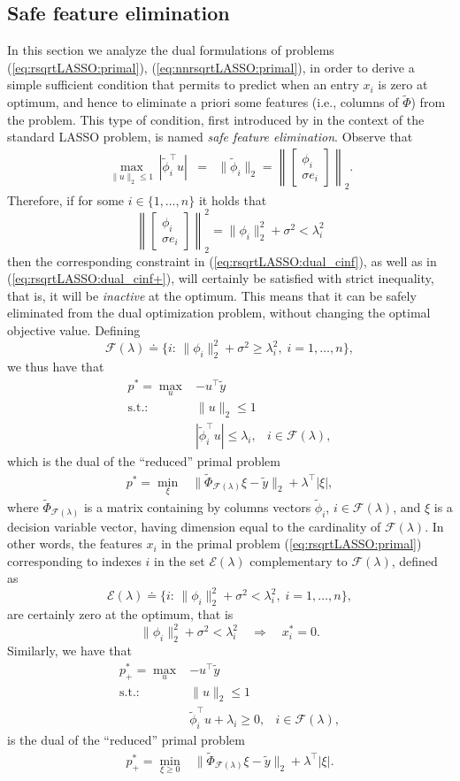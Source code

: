 \documentclass[11pt]{article}
\newcommand{\tran}{^{\top}}
\newcommand{\lam}{\lambda}
\newcommand{\beq}{\begin{equation}}
\newcommand{\eeq}{\end{equation}}
\newcommand{\bea}{\begin{eqnarray}}
\newcommand{\eea}{\end{eqnarray}}
\newcommand{\beas}{\begin{eqnarray*}}
\newcommand{\eeas}{\end{eqnarray*}}
\newcommand{\ba}{\begin{array}}
\newcommand{\ea}{\end{array}}
\newcommand{\calE}{{\mathcal E}}
\newcommand{\calF}{{\mathcal F}}
\begin{document}
\subsection{Safe feature elimination}
\label{sec:safelim}
In this section we analyze the dual formulations of problems (\ref{eq:rsqrtLASSO:primal}), (\ref{eq:nnrsqrtLASSO:primal}), in order to derive
a simple sufficient condition that permits to predict when an entry
$x_i$ is zero  at optimum, and hence to
eliminate a priori some features (i.e., columns of $\tilde \Phi$) from the problem.
This type of condition, first introduced by \cite{ElgViRa:12} in the context of the standard LASSO problem, is named {\em safe feature elimination}.
Observe that
\beas
\max_{ \|u\|_2\leq 1}\, |\tilde \phi_i\tran u | &=& \|\tilde\phi_i\|_2 = 
\left\|\left[\ba{c}\phi_i \\ \sigma e_i \ea\right]\right\|_2.
\eeas
Therefore, if for some $i\in\{1,\ldots,n\}$ it holds that
\[
\left\|\left[\ba{c}\phi_i \\ \sigma e_i \ea\right]\right\|_2^2 = 
\|\phi_i\|_2^2 + \sigma^2 < \lam_i^2
\]
then the corresponding constraint
in (\ref{eq:rsqrtLASSO:dual_cinf}), 
as well as in (\ref{eq:rsqrtLASSO:dual_cinf+}),
will certainly be satisfied with strict inequality, that is, it will be {\em inactive}
at the optimum.
This means that  it can be safely eliminated from the dual optimization problem, without changing the optimal objective value. Defining
\[
\calF(\lam) \doteq \{i:\,  \|\phi_i\|_2^2 +\sigma^2 \geq  \lam_i^2,\;  i=1,\ldots, n\},
\]
we thus have that
 \bea
p^*  = \displaystyle{\max_{u}} & 
-u\tran  \tilde y   \label{eq:rsqrtLASSO:dual_red} \\
\mbox{s.t.:} & \|u\|_2\leq 1 \nonumber \\
& |\tilde \phi_i\tran u  | \leq \lam_i , &  i\in\calF(\lam) \label{eq:rsqrtLASSO:dual_cinf_red} \nonumber ,
\eea
which is the dual of the ``reduced'' primal problem
\bea
p^*  = \min_{\xi} &
\|\tilde \Phi_{\calF(\lam)} \xi  - \tilde y 
\|_2
 + \lam\tran  |\xi|,
\label{eq:rsqrtLASSO:primal_red}
\eea
where $\tilde \Phi_{\calF(\lam)}$ is a matrix containing by columns vectors $\tilde \phi_i$, $i\in\calF(\lam)$,
and $\xi$ is a decision variable vector, having dimension equal to the cardinality of $\calF(\lam)$.
In other words, the features $x_i$ in the primal problem (\ref{eq:rsqrtLASSO:primal})
corresponding to indexes $i$ in the set $\calE(\lam)$  complementary to $\calF(\lam)$, defined as
\[
\calE(\lam) \doteq \{i:\,  \|\phi_i\|_2^2 +\sigma^2  < \lam_i^2,\;  i=1,\ldots, n\},
\]
are certainly zero at the optimum, that is
\beq
\|\phi_i\|_2^2 + \sigma^2 < \lam_i^2  \quad \Rightarrow \quad x_i^* = 0.
\label{eq:feature-elim}
\eeq
Similarly,  we have that
 \bea
p^* _+ = \displaystyle{\max_{u}} & 
-u\tran  \tilde y   \label{eq:nnrsqrtLASSO:dual_red} \\
\mbox{s.t.:} & \|u\|_2\leq 1   \nonumber \\
& \tilde \phi_i\tran u   + \lam_i \geq 0, &  i\in\calF(\lam) \label{eq:nnrsqrtLASSO:dual_cinf_red} \nonumber ,
\eea
is the dual of  the ``reduced'' primal problem
\bea
p^*_+  = \min_{\xi\geq 0} & \|\tilde \Phi_{\calF(\lam)} \xi  - \tilde y \|_2+ \lam\tran  |\xi|.
\label{eq:nnrsqrtLASSO:primal_red}
\eea
\end{document}
